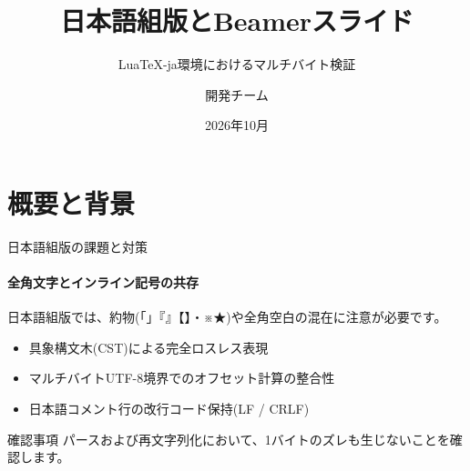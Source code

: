 \documentclass[unicode]{beamer}
\title{日本語組版とBeamerスライド}
\subtitle{LuaTeX-ja環境におけるマルチバイト検証}
\author{開発チーム}
\institute{次世代エディタ研究所}
\date{2026年10月}
\begin{document}
\begin{frame}
  \titlepage
\end{frame}

\section{概要と背景}

\begin{frame}{日本語組版の課題と対策}
  \framesubtitle{全角文字とインライン記号の共存}
  日本語組版では、約物(「」『』【】・※★)や全角空白の混在に注意が必要です。

  \begin{itemize}
    \item 具象構文木(CST)による完全ロスレス表現
    \item マルチバイトUTF-8境界でのオフセット計算の整合性
    \item 日本語コメント行の改行コード保持(LF / CRLF)
  \end{itemize}

  \begin{block}{確認事項}
    パースおよび再文字列化において、1バイトのズレも生じないことを確認します。
  \end{block}
\end{frame}
\end{document}
